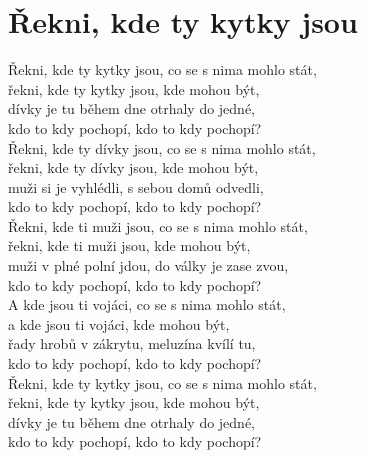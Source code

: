 \section{Řekni, kde ty kytky jsou}
\onehalfspacing

Řekni, kde ty kytky jsou, co se s nima mohlo stát,\\
řekni, kde ty kytky jsou, kde mohou být,\\
dívky je tu během dne otrhaly do jedné,\\
kdo to kdy pochopí, kdo to kdy pochopí?\\

\sloka
Řekni, kde ty dívky jsou, co se s nima mohlo stát,\\
řekni, kde ty dívky jsou, kde mohou být,\\
muži si je vyhlédli, s sebou domů odvedli,\\
kdo to kdy pochopí, kdo to kdy pochopí?\\

\sloka
Řekni, kde ti muži jsou, co se s nima mohlo stát,\\
řekni, kde ti muži jsou, kde mohou být,\\
muži v plné polní jdou, do války je zase zvou,\\
kdo to kdy pochopí, kdo to kdy pochopí?\\

\sloka
A kde jsou ti vojáci, co se s nima mohlo stát,\\
a kde jsou ti vojáci, kde mohou být,\\
řady hrobů v zákrytu, meluzína kvílí tu,\\
kdo to kdy pochopí, kdo to kdy pochopí?\\

\sloka
{}Řekni, kde ty kytky jsou, co se s nima mohlo stát,\\
řekni, kde ty kytky jsou, kde mohou být,\\
dívky je tu během dne otrhaly do jedné,\\
kdo to kdy pochopí, kdo to kdy pochopí?\\